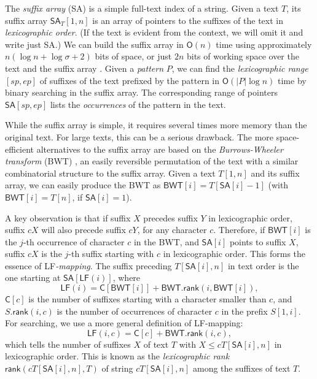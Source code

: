 \documentclass[smallabstract,smallcaptions]{dccpaper}
\newcommand{\abs}[1]{\ensuremath{\lvert #1 \rvert}}
\newcommand{\Oh}{\ensuremath{\mathsf{O}}}
\newcommand{\SA}{\textsf{SA}}
\newcommand{\BWT}{\textsf{BWT}}
\newcommand{\mSA}{\ensuremath{\mathsf{SA}}}
\newcommand{\mBWT}{\ensuremath{\mathsf{BWT}}}
\newcommand{\mC}{\ensuremath{\mathsf{C}}}
\newcommand{\LF}{\textsf{LF}}
\newcommand{\mLF}{\ensuremath{\mathsf{LF}}}
\newcommand{\mrank}{\ensuremath{\mathsf{rank}}}
\begin{document}
The \emph{suffix array} (\SA) \cite{Manber1993} is a simple full-text index of a string. Given a text $T$, its suffix array $\mSA_{T}[1,n]$ is an array of pointers to the suffixes of the text in \emph{lexicographic order}. (If the text is evident from the context, we will omit it and write just \SA.) We can build the suffix array in $\Oh(n)$ time using approximately $n(\log n + \log \sigma + 2)$ bits of space, or just $2n$ bits of working space over the text and the suffix array \cite{Nong2011}. Given a \emph{pattern} $P$, we can find the \emph{lexicographic range} $[sp,ep]$ of suffixes of the text prefixed by the pattern in $\Oh(\abs{P} \log n)$ time by binary searching in the suffix array. The corresponding range of pointers $\mSA[sp,ep]$ lists the \emph{occurrences} of the pattern in the text.

While the suffix array is simple, it requires several times more memory than the original text. For large texts, this can be a serious drawback. The more space-efficient alternatives to the suffix array are based on the \emph{Burrows-Wheeler transform} (\BWT) \cite{Burrows1994}, an easily reversible permutation of the text with a similar combinatorial structure to the suffix array. Given a text $T[1,n]$ and its suffix array, we can easily produce the \BWT{} as $\mBWT[i] = T[\mSA[i]-1]$ (with $\mBWT[i] = T[n]$, if $\mSA[i] = 1$).

A key observation is that if suffix $X$ precedes suffix $Y$ in lexicographic order, suffix $cX$ will also precede suffix $cY$, for any character $c$. Therefore, if $\mBWT[i]$ is the $j$\nobreakdash-th occurrence of character $c$ in the \BWT, and $\mSA[i]$ points to suffix $X$, suffix $cX$ is the $j$\nobreakdash-th suffix starting with $c$ in lexicographic order. This forms the essence of \LF\emph{\nobreakdash-mapping}. The suffix preceding $T[\mSA[i],n]$ in text order is the one starting at $\mSA[\mLF(i)]$, where
$$
\mLF(i) = \mC[\mBWT[i]] + \mBWT.\mrank(i, \mBWT[i]),
$$
$\mC[c]$ is the number of suffixes starting with a character smaller than $c$, and $S.\mrank(i,c)$ is the number of occurrences of character $c$ in the prefix $S[1,i]$. For searching, we use a more general definition of \LF\nobreakdash-mapping:
$$
\mLF(i,c) = \mC[c] + \mBWT.\mrank(i, c),
$$
which tells the number of suffixes $X$ of text $T$ with $X \le c T[\mSA[i],n]$ in lexicographic order. This is known as the \emph{lexicographic rank} $\mrank(cT[\mSA[i],n], T)$ of string $cT[\mSA[i],n]$ among the suffixes of text $T$.
\end{document}
